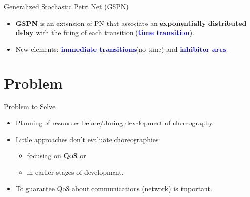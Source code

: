 \documentclass[xcolor=svgnames]{beamer}
\begin{document}
  \begin{frame}{ Generalized Stochastic Petri Net (GSPN)}
    \begin{itemize}
        \item < 1->\textbf{GSPN} is an extension of PN that associate an \textbf{exponentially distributed delay} with
         the firing of each transition (\textbf{\textcolor{blue}{time transition}}).
        \item < 2->New elements: \textbf{\textcolor{blue}{immediate transitions}}(no time) and \textbf{\textcolor{blue}{inhibitor arcs}}. %
	\end{itemize}

  \end{frame}
\section{Problem}


    \begin{frame}{Problem to Solve}
    	\begin{itemize}
          \item <1-> Planning of resources before/during development of choreography.
          \item <2-> Little approaches don't evaluate choreographies:
	    \begin{itemize}
	      \item focusing on \textbf{QoS} or
	      \item in earlier stages of development.
	    \end{itemize}
          \item <3-> To guarantee QoS about communications (network) is important.
    	\end{itemize}
    \end{frame}
\end{document}
